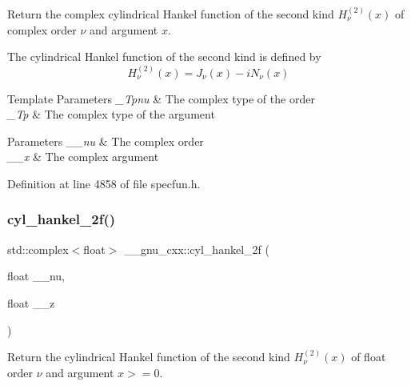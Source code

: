 Return the complex cylindrical Hankel function of the second kind $ H^{(2)}_\nu(x) $ of complex order $ \nu $ and argument $ x $.

The cylindrical Hankel function of the second kind is defined by \[ H^{(2)}_\nu(x) = J_\nu(x) - i N_\nu(x) \]


\begin{DoxyTemplParams}{Template Parameters}
{\em \+\_\+\+Tpnu} & The complex type of the order \\
\hline
{\em \+\_\+\+Tp} & The complex type of the argument \\
\hline
\end{DoxyTemplParams}

\begin{DoxyParams}{Parameters}
{\em \+\_\+\+\_\+nu} & The complex order \\
\hline
{\em \+\_\+\+\_\+x} & The complex argument \\
\hline
\end{DoxyParams}


Definition at line 4858 of file specfun.\+h.

\mbox{\label{group__gnu__math__spec__func_ga2b75361870975c47d57bed71b4064ce7}} 
\subsubsection{\texorpdfstring{cyl\+\_\+hankel\+\_\+2f()}{cyl\_hankel\_2f()}\hspace{0.1cm}{\footnotesize\ttfamily [1/2]}}
{\footnotesize\ttfamily std\+::complex$<$float$>$ \+\_\+\+\_\+gnu\+\_\+cxx\+::cyl\+\_\+hankel\+\_\+2f (\begin{DoxyParamCaption}\item[{float}]{\+\_\+\+\_\+nu,  }\item[{float}]{\+\_\+\+\_\+z }\end{DoxyParamCaption})\hspace{0.3cm}{\ttfamily [inline]}}

Return the cylindrical Hankel function of the second kind $ H^{(2)}_\nu(x) $ of {\ttfamily float} order $ \nu $ and argument $ x >= 0 $.


